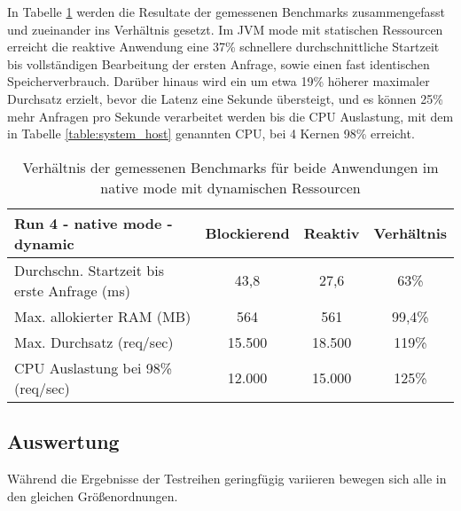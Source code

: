 In Tabelle \ref{table:dynamic_native_measurement_results} werden die Resultate der gemessenen Benchmarks zusammengefasst
und zueinander ins Verhältnis gesetzt. Im JVM mode mit statischen Ressourcen erreicht die reaktive Anwendung
eine 37\% schnellere durchschnittliche Startzeit bis vollständigen Bearbeitung der ersten Anfrage, sowie einen fast identischen
Speicherverbrauch.
Darüber hinaus wird ein um etwa 19\% höherer maximaler Durchsatz erzielt, bevor die Latenz eine Sekunde übersteigt, und
es können 25\% mehr Anfragen pro Sekunde verarbeitet werden bis die CPU Auslastung, mit dem in Tabelle \ref{table:system_host}
genannten CPU, bei 4 Kernen 98\% erreicht.

\begin{table}[ht!]
    \begin{tabular}{|l | c | c | c|}
        \hline
        Run 4 - native mode - dynamic & Blockierend & Reaktiv & Verhältnis \\
        \hline
        \makecell[l]{Durchschn. Startzeit bis                              \\erste Anfrage (ms)} &   43,8    &  27,6 &   63\%   \\
        \hline
        Max. allokierter RAM (MB)     & 564         & 561     & 99,4\%     \\
        \hline
        Max. Durchsatz (req/sec)      & 15.500      & 18.500  & 119\%      \\
        \hline
        \makecell[l]{CPU Auslastung bei 98\%                               \\(req/sec)} & 12.000 & 15.000 & 125\%  \\
        \hline
    \end{tabular}
    \caption{Verhältnis der gemessenen Benchmarks für beide Anwendungen im native mode mit dynamischen Ressourcen}
    \label{table:dynamic_native_measurement_results}
\end{table}

\subsection{Auswertung}
\label{subsubsec:auswertung}
Während die Ergebnisse der Testreihen geringfügig variieren bewegen sich alle in den gleichen Größenordnungen.

